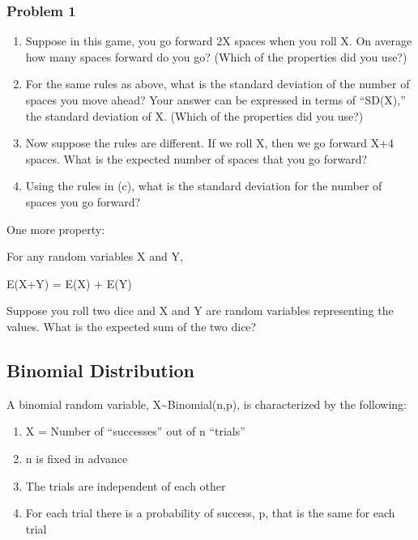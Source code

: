 \documentclass[]{article}
\begin{document}
\hypertarget{problem-1}{%
\subsubsection{Problem 1}\label{problem-1}}

\begin{enumerate}
\def\labelenumi{\alph{enumi})}
\item
  Suppose in this game, you go forward 2X spaces when you roll X. On
  average how many spaces forward do you go? (Which of the properties
  did you use?)
\item
  For the same rules as above, what is the standard deviation of the
  number of spaces you move ahead? Your answer can be expressed in terms
  of ``SD(X),'' the standard deviation of X. (Which of the properties
  did you use?)
\item
  Now suppose the rules are different. If we roll X, then we go forward
  X+4 spaces. What is the expected number of spaces that you go forward?
\item
  Using the rules in (c), what is the standard deviation for the number
  of spaces you go forward?
\end{enumerate}

One more property:

For any random variables X and Y,

E(X+Y) = E(X) + E(Y)

Suppose you roll two dice and X and Y are random variables representing
the values. What is the expected sum of the two dice?

\hypertarget{binomial-distribution}{%
\subsection{Binomial Distribution}\label{binomial-distribution}}

A binomial random variable, X\textasciitilde Binomial(n,p), is
characterized by the following:

\begin{enumerate}
\def\labelenumi{\arabic{enumi}.}
\item
  X = Number of ``successes'' out of n ``trials''
\item
  n is fixed in advance
\item
  The trials are independent of each other
\item
  For each trial there is a probability of success, p, that is the same
  for each trial
\end{enumerate}
\end{document}
